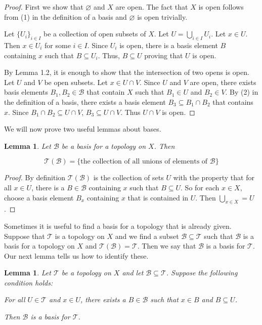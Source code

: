 \documentclass[a4paper]{article}
\newtheorem{lemma}[theorem]{Lemma}
\numberwithin{theorem}{section}
\begin{document}
\begin{proof}
First we show that $\varnothing$ and $X$ are open. The fact that $X$ is open follows from (1) in the definition of a basis and $\varnothing$ is open trivially.

Let $\{U_i\}_{i \in I}$ be a collection of open subsets of $X$. Let $U = \underset{i \in I}{\bigcup} U_i$. Let $x \in U$. Then $x \in U_i$ for some $i \in I$. Since $U_i$ is open, there is a basis element $B$ containing $x$ such that $B \subseteq U_i$. Thus, $B \subseteq U$ proving that $U$ is open.

By Lemma 1.2, it is enough to show that the intersection of two opens is open. Let $U$ and $V$ be open subsets. Let $x \in U \cap V$. Since $U$ and $V$ are open, there exists basis elements $B_1,B_2 \in \mathcal{B}$ that contain $X$ such that $B_1 \in U$ and $B_2 \in V$. By (2) in the definition of a basis, there exists a basis element $B_3 \subseteq B_1 \cap B_2$ that contains $x$. Since $B_1 \cap B_2 \subseteq U \cap V$, $B_3 \subseteq U \cap V$. Thus $U \cap V$ is open.

\end{proof}

We will now prove two useful lemmas about bases.

\begin{lemma}
Let $\mathcal{B}$ be a basis for a topology on $X$. Then

$$ \mathcal{T}(\mathcal{B}) = \{\textrm{the collection of all unions of elements of } \mathcal{B}\}$$
\end{lemma}

\begin{proof}
By definition $\mathcal{T}(\mathcal{B})$ is the collection of sets $U$ with the property that for all $x \in U$, there is a $B \in \mathcal{B}$ containing $x$ such that $B \subseteq U$. So for each $x \in X$, choose a basis element $B_x$ containing $x$ that is contained in $U$. Then $\bigcup_{x \in X} = U$.

\end{proof}

Sometimes it is useful to find a basis for a topology that is already given. Suppose that $\mathcal{T}$ is a topology on $X$ and we find a subset $\mathcal{B} \subseteq \mathcal{T}$ such that $\mathcal{B}$ is a basis for a topology on $X$ and $\mathcal{T}(\mathcal{B}) = \mathcal{T}$. Then we say that $\mathcal{B}$ is a basis for $\mathcal{T}$. Our next lemma tells us how to identify these.

\begin{lemma}
Let $\mathcal{T}$ be a topology on $X$ and let $\mathcal{B} \subseteq \mathcal{T}$. Suppose the following condition holds:

\begin{center}
    For all $U \in \mathcal{T}$ and $x \in U$, there exists a $B \in \mathcal{B}$ such that $x \in B$ and $B \subseteq U$.
\end{center}

Then $\mathcal{B}$ is a basis for $\mathcal{T}$.

\end{lemma}
\end{document}
